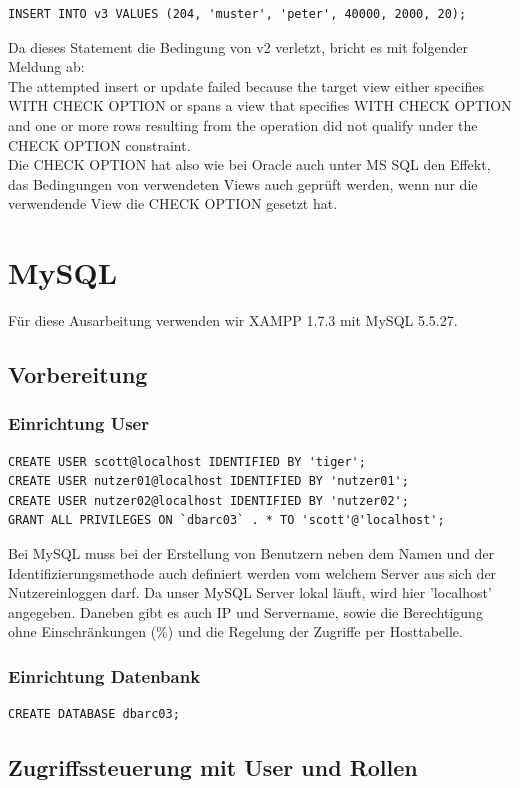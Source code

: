 \documentclass[10pt]{scrreprt}
\begin{document}
\begin{lstlisting}[style=sql]
INSERT INTO v3 VALUES (204, 'muster', 'peter', 40000, 2000, 20);
\end{lstlisting}
Da dieses Statement  die Bedingung von v2 verletzt, bricht es mit folgender Meldung ab:\\
The attempted insert or update failed because the target view either specifies WITH CHECK OPTION or spans a view that specifies WITH CHECK OPTION and one or more rows resulting from the operation did not qualify under the CHECK OPTION constraint.\\
Die CHECK OPTION hat also wie bei Oracle auch unter MS SQL den Effekt, das Bedingungen von verwendeten Views auch geprüft werden, wenn nur die verwendende View die CHECK OPTION gesetzt hat.

\chapter{MySQL}
Für diese Ausarbeitung verwenden wir XAMPP 1.7.3 mit MySQL 5.5.27.
\section{Vorbereitung}
\subsection{Einrichtung User}
\begin{lstlisting}[style=sql]
CREATE USER scott@localhost IDENTIFIED BY 'tiger';
CREATE USER nutzer01@localhost IDENTIFIED BY 'nutzer01';
CREATE USER nutzer02@localhost IDENTIFIED BY 'nutzer02';
GRANT ALL PRIVILEGES ON `dbarc03` . * TO 'scott'@'localhost';
\end{lstlisting}
Bei MySQL muss bei der Erstellung von Benutzern neben dem Namen und der Identifizierungsmethode auch definiert werden vom welchem Server aus sich der Nutzereinloggen darf. Da unser MySQL Server lokal läuft, wird hier 'localhost' angegeben. Daneben gibt es auch IP und Servername, sowie die Berechtigung ohne Einschränkungen (\%) und die Regelung der Zugriffe per Hosttabelle.
\subsection{Einrichtung Datenbank}
\begin{lstlisting}[style=sql]
CREATE DATABASE dbarc03;
\end{lstlisting}

\section{Zugriffssteuerung mit User und Rollen}
\end{document}
